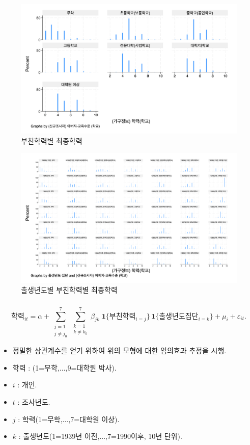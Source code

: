 \documentclass[aspectratio=169,xcolor=dvipsnames,handout]{beamer}
\begin{document}
\begin{frame}[<+->]
    \begin{figure}
        \centering
        \includegraphics[width=.75\textwidth]{pic/eduk2.png}
        \caption{부친학력별 최종학력}
    \end{figure}
\end{frame}

\begin{frame}[<+->]
    \begin{figure}
        \centering
        \includegraphics[width=.75\textwidth]{pic/eduk3.png}
        \caption{출생년도별 부친학력별 최종학력}
    \end{figure}
\end{frame}

\begin{frame}[<+->]
\frametitle{}
    \begin{equation}
    \text{학력}_{it}
        = \alpha
        + \sum_{\substack{j=1\\ j\neq j_0}}^{7}
        \sum_{\substack{k=1\\ k\neq k_0}}^{7}
        \beta_{jk}\;
        \mathbf{1}\!\{\text{부친학력}_{i=j}\}\,\mathbf{1}\!\{\text{출생년도집단}_{i=k}\}
        + \mu_i + \varepsilon_{it}.
    \end{equation}
    \begin{itemize}[<+->]
        \item 정밀한 상관계수를 얻기 위하여 위의 모형에 대한 임의효과 추정을 시행.
        \item 학력 : (1=무학,$\ldots$,9=대학원 박사).
        \item $i$ : 개인.
        \item $t$ : 조사년도.
        \item $j$ : 학력(1=무학,$\ldots$,7=대학원 이상).
        \item $k$ : 출생년도(1=1939년 이전,$\ldots$,7=1990이후, 10년 단위).
    \end{itemize}
\end{frame}
\end{document}
